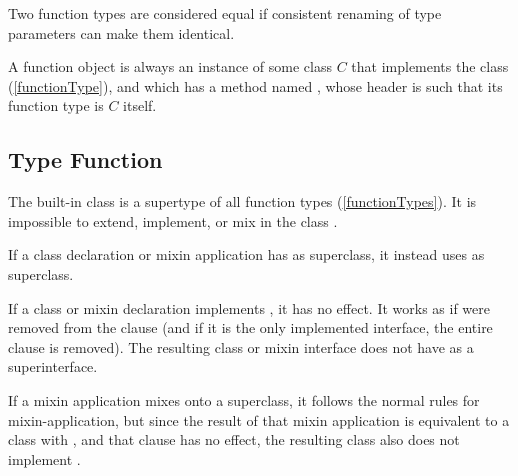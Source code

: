 \documentclass[makeidx]{article}
\begin{document}
{\LMHash{}%
Two function types are considered equal if consistent renaming of type
parameters can make them identical.


\LMHash{}%
A function object is always an instance of some class $C$ that implements
the class \FUNCTION{} (\ref{functionType}),
and which has a method named \CALL,
whose header is such that its function type is $C$ itself.


\subsection{Type Function}

\LMHash{}%
The built-in class \FUNCTION{} is a supertype of all function types
(\ref{functionTypes}).
It is impossible to extend, implement, or mix in the class \FUNCTION.

\LMHash{}%
If a class declaration or mixin application has \FUNCTION{} as superclass,
it instead uses  as superclass.

\LMHash{}%
If a class or mixin declaration implements \FUNCTION, it has no effect.
It works as if \FUNCTION{} were removed from the  clause
(and if it is the only implemented interface, the entire clause is removed).
The resulting class or mixin interface
does not have \FUNCTION{} as a superinterface.

\LMHash{}%
If a mixin application mixes \FUNCTION{} onto a superclass, it follows the
normal rules for mixin-application, but since the result of that mixin
application is equivalent to a class with , and
that clause has no effect, the resulting class also does not
implement \FUNCTION.



}
\end{document}
